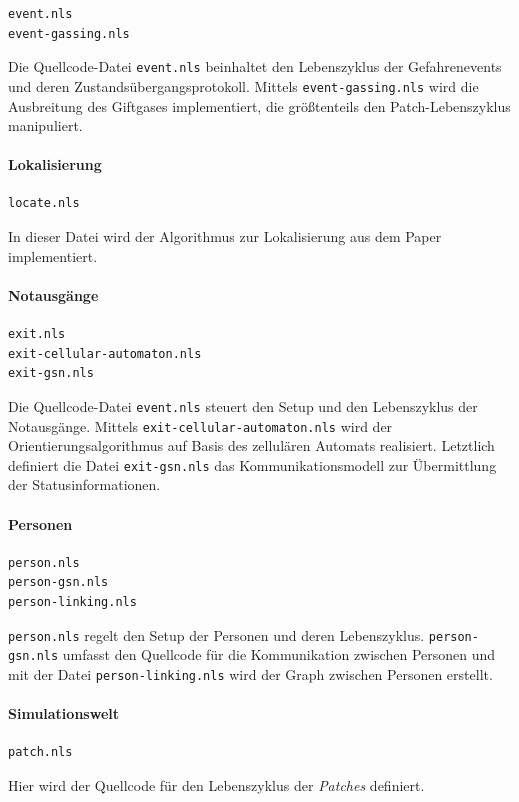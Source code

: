 \begin{verbatim}
event.nls
event-gassing.nls
\end{verbatim}

Die Quellcode-Datei \verb|event.nls| beinhaltet den Lebenszyklus der Gefahrenevents und deren Zustandsübergangsprotokoll. Mittels \verb|event-gassing.nls| wird die Ausbreitung des Giftgases implementiert, die größtenteils den Patch-Lebenszyklus manipuliert.

\paragraph{Lokalisierung}

\begin{verbatim}
locate.nls
\end{verbatim}

In dieser Datei wird der Algorithmus zur Lokalisierung aus dem Paper \cite{Jonathan.2004} implementiert.

\paragraph{Notausgänge}

\begin{verbatim}
exit.nls
exit-cellular-automaton.nls
exit-gsn.nls
\end{verbatim}

Die Quellcode-Datei \verb|event.nls| steuert den Setup und den Lebenszyklus der Notausgänge. Mittels \verb|exit-cellular-automaton.nls| wird der Orientierungsalgorithmus auf Basis des zellulären Automats realisiert. Letztlich definiert die Datei \verb|exit-gsn.nls| das Kommunikationsmodell zur Übermittlung der Statusinformationen.

\paragraph{Personen}

\begin{verbatim}
person.nls
person-gsn.nls
person-linking.nls
\end{verbatim}

\verb|person.nls| regelt den Setup der Personen und deren Lebenszyklus. \verb|person-gsn.nls| umfasst den Quellcode für die Kommunikation zwischen Personen und mit der Datei \verb|person-linking.nls| wird der Graph zwischen Personen erstellt.

\paragraph{Simulationswelt}

\begin{verbatim}
patch.nls
\end{verbatim}

Hier wird der Quellcode für den Lebenszyklus der \emph{Patches} definiert.